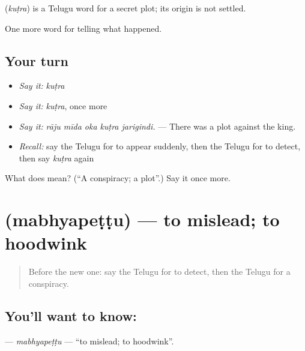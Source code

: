 \begin{cousinweb}
\textbf{} (\emph{kuṭra}) is a Telugu word for a secret plot; its origin is not settled.
\end{cousinweb}

\begin{grammarlens}[title={What you've built}]
One more word for telling what happened.
\end{grammarlens}

\subsection*{Your turn}
\begin{itemize}
\raggedright
  \item \emph{Say it:} \emph{kuṭra}
  \item \emph{Say it:} \emph{kuṭra}, once more
  \item \emph{Say it:} \emph{rāju mīda oka kuṭra jarigindi.} — There was a plot against the king.
  \item \emph{Recall:} say the Telugu for to appear suddenly, then the Telugu for to detect, then say \emph{kuṭra} again
\end{itemize}

\begin{tcolorbox}[breakable,colback=teal!4,colframe=teal!35!black,title={Before you move on}]
What does  mean? (\textquotedblleft{}A conspiracy; a plot\textquotedblright{}.) Say it once more.
\end{tcolorbox}
\section[\texorpdfstring{\te{మభ్యపెట్టు} (mabhyapeṭṭu)}{మభ్యపెట్టు (mabhyapeṭṭu)}]{ (mabhyapeṭṭu) — to mislead; to hoodwink}

\label{lesson:TE-C354-mabhyapettu}



\begin{quote}
Before the new one: say the Telugu for to detect, then the Telugu for a conspiracy.
\end{quote}

\subsection*{You'll want to know: }
\textbf{} — \emph{mabhyapeṭṭu} — \textquotedblleft{}to mislead; to hoodwink\textquotedblright{}.

